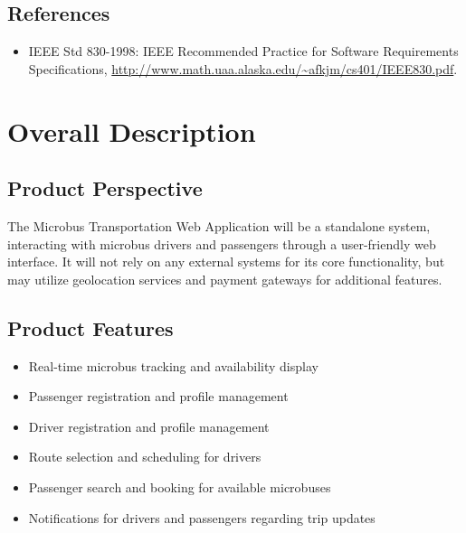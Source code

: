 \documentclass{BusMateSRS}
\begin{document}
\section{References}
\begin{itemize}
  \item IEEE Std 830-1998: IEEE Recommended Practice for Software Requirements 
    Specifications, \url{http://www.math.uaa.alaska.edu/~afkjm/cs401/IEEE830.pdf}.
\end{itemize}



\chapter{Overall Description}
\section{Product Perspective}
The Microbus Transportation Web Application will be a standalone system, 
interacting with microbus drivers and passengers through a user-friendly 
web interface. It will not rely on any external systems for its core 
functionality, but may utilize geolocation services and payment gateways for 
additional features.

\section{Product Features}
\begin{itemize}
  \item Real-time microbus tracking and availability display
  \item Passenger registration and profile management
  \item Driver registration and profile management
  \item Route selection and scheduling for drivers
  \item Passenger search and booking for available microbuses
  \item Notifications for drivers and passengers regarding trip updates
\end{itemize}
\end{document}
